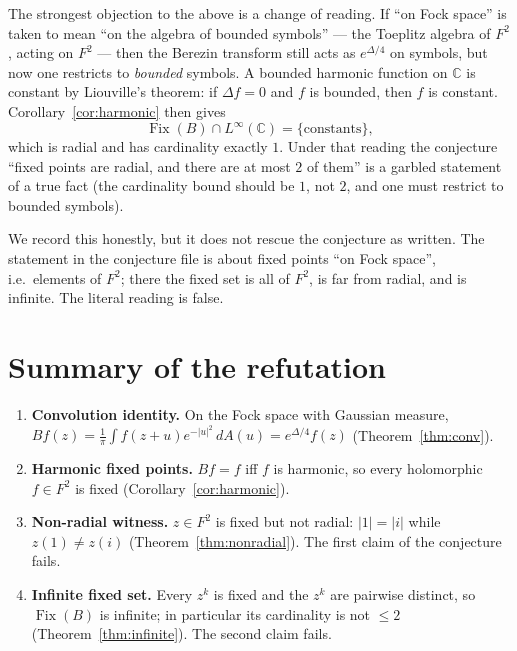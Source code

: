 \documentclass[11pt]{article}
\theoremstyle{definition}
\newcommand{\dA}{\,dA}
\newcommand{\C}{\mathbb{C}}
\begin{document}
The strongest objection to the above is a change of reading. If ``on Fock
space'' is taken to mean ``on the algebra of bounded symbols'' --- the Toeplitz
algebra of $F^2$, acting on $F^2$ --- then the Berezin transform still acts as
$e^{\Delta/4}$ on symbols, but now one restricts to \emph{bounded} symbols. A
bounded harmonic function on $\C$ is constant by Liouville's theorem: if
$\Delta f=0$ and $f$ is bounded, then $f$ is constant. Corollary~\ref{cor:harmonic}
then gives
\[
  \operatorname{Fix}(B)\cap L^\infty(\C)=\{\text{constants}\},
\]
which is radial and has cardinality exactly $1$. Under that reading the
conjecture ``fixed points are radial, and there are at most $2$ of them'' is a
garbled statement of a true fact (the cardinality bound should be $1$, not $2$,
and one must restrict to bounded symbols).

We record this honestly, but it does not rescue the conjecture as written. The
statement in the conjecture file is about fixed points ``on Fock space'', i.e.\
elements of $F^2$; there the fixed set is all of $F^2$, is far from radial, and
is infinite. The literal reading is false.

\section{Summary of the refutation}

\begin{enumerate}
  \item \textbf{Convolution identity.} On the Fock space with Gaussian measure,
        $Bf(z)=\frac1\pi\int f(z+u)e^{-|u|^2}\dA(u)=e^{\Delta/4}f(z)$
        (Theorem~\ref{thm:conv}).
  \item \textbf{Harmonic fixed points.} $Bf=f$ iff $f$ is harmonic, so every
        holomorphic $f\in F^2$ is fixed (Corollary~\ref{cor:harmonic}).
  \item \textbf{Non-radial witness.} $z\in F^2$ is fixed but not radial:
        $|1|=|i|$ while $z(1)\neq z(i)$ (Theorem~\ref{thm:nonradial}). The
        first claim of the conjecture fails.
  \item \textbf{Infinite fixed set.} Every $z^k$ is fixed and the $z^k$ are
        pairwise distinct, so $\operatorname{Fix}(B)$ is infinite; in
        particular its cardinality is not $\le2$ (Theorem~\ref{thm:infinite}).
        The second claim fails.
\end{enumerate}
\end{document}
